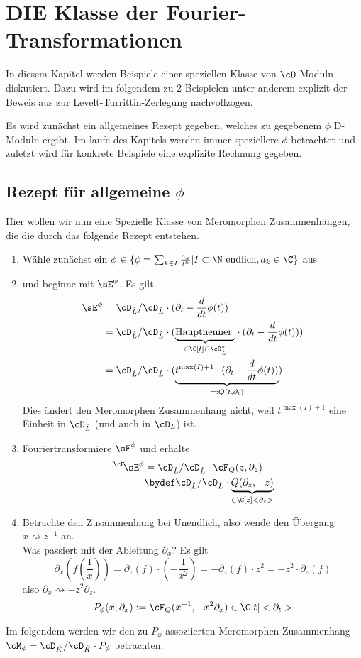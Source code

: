 \chapter{DIE Klasse der Fourier-Transformationen}
In diesem Kapitel werden Beispiele einer speziellen Klasse von $\cD$-Moduln
diskutiert. Dazu wird im folgendem zu 2 Beispielen unter anderem explizit der
Beweis aus \cite{sabbah_cimpa90} zur Levelt-Turrittin-Zerlegung nachvollzogen.

Es wird zunächst ein allgemeines Rezept gegeben, welches zu gegebenem $\phi$
D-Moduln ergibt. Im laufe des Kapitels werden immer speziellere $\phi$
betrachtet und zuletzt wird für konkrete Beispiele eine explizite Rechnung
gegeben.

\section{Rezept für allgemeine $\phi$} \label{sec:allgemeinProblem}
Hier wollen wir nun eine Spezielle Klasse von Meromorphen Zusammenhängen, die
die durch das folgende Rezept entstehen.
\begin{enumerate}
\item Wähle zunächst ein $\phi$
$\in\{\phi=\sum_{k\in I}\frac{a_k}{t^{k}}|I\subset\N\mbox{ endlich}
,a_k\in \C\}$
aus
\item und beginne mit $\sE^{\phi}$. Es gilt
\begin{align*}
\sE^{\phi} &= \cD_{\hat L}/\cD_{\hat L}\cdot (\partial_t-\frac{d}{dt}\phi(t))
\\&=\cD_{\hat L}/\cD_{\hat L}\cdot (\underset{\in\C[t]\subset\cD_{\hat L}^*}
    {\underbrace{\mbox{Hauptnenner }}}
  \cdot (\partial_t-\frac{d}{dt}\phi(t)))
\\&=\cD_{\hat L}/\cD_{\hat L}\cdot ( \underset{=:Q(t,\partial_t)}{\underbrace{
  t^{\max(I)+1} \cdot (\partial_t-\frac{d}{dt}\phi(t))}})
\end{align*}
Dies ändert den Meromorphen Zusammenhang nicht, weil $t^{\max(I)+1}$ eine
Einheit in $\cD_{\hat L}$ (und auch in $\cD_{L}$) ist.
\item Fouriertransformiere $\sE^{\phi}$ und erhalte
\begin{align*}
\,^\cF\!\sE^{\phi}&=\cD_{\hat L}/\cD_{\hat L}\cdot{\cF_Q(z,\partial_z)}
\\&\bydef \cD_{\hat L}/\cD_{\hat L}\cdot 
  \underset{\in\C[z]<\partial_z>}{\underbrace{Q(\partial_z,-z)}}
\end{align*}
\item Betrachte den Zusammenhang bei Unendlich, also wende den Übergang
$x\rightsquigarrow z^{-1}$ an.\\
Was passiert mit der Ableitung $\partial_x$?
Es gilt
\[
\partial_x (f(\frac{1}{x}))=
\partial_z(f)\cdot (-\frac{1}{x^2})=
-\partial_z(f)\cdot z^2= %
- z^2 \cdot \partial_z(f)
\]
also $ \partial_x\rightsquigarrow-z^2\partial_z $.
\[
P_\phi(x,\partial_x):=\cF_Q(x^{-1},-x^2\partial_x) \in \C[t]<\partial_t>
\]
\end{enumerate}
Im folgendem werden wir den zu $P_\phi$ assoziierten Meromorphen Zusammenhang
$\cM_\phi=\cD_{\hat K}/\cD_{\hat K}\cdot P_{\phi}$ betrachten.

